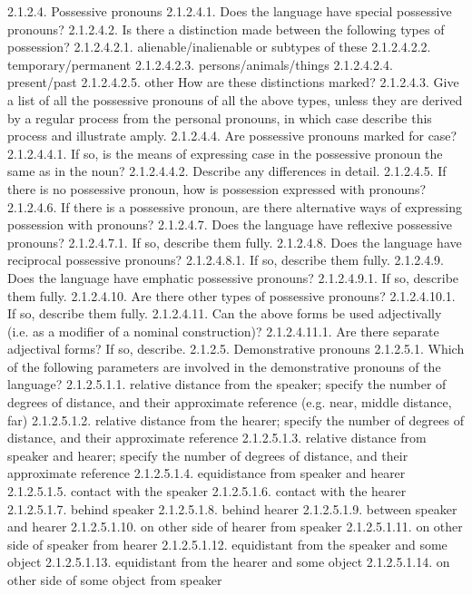 2.1.2.4. Possessive pronouns
2.1.2.4.1. Does the language have special possessive pronouns?
2.1.2.4.2. Is there a distinction made between the following types of possession?
2.1.2.4.2.1. alienable/inalienable or subtypes of these
2.1.2.4.2.2. temporary/permanent
2.1.2.4.2.3. persons/animals/things
2.1.2.4.2.4. present/past
2.1.2.4.2.5. other
How are these distinctions marked?
2.1.2.4.3. Give a list of all the possessive pronouns of all the above types, unless they are derived by a regular process from the personal pronouns, in which case describe this process and illustrate amply.
2.1.2.4.4. Are possessive pronouns marked for case?
2.1.2.4.4.1. If so, is the means of expressing case in the possessive pronoun the same as in the noun?
2.1.2.4.4.2. Describe any differences in detail.
2.1.2.4.5. If there is no possessive pronoun, how is possession expressed with pronouns?
2.1.2.4.6. If there is a possessive pronoun, are there alternative ways of expressing possession with pronouns?
2.1.2.4.7. Does the language have reflexive possessive pronouns?
2.1.2.4.7.1. If so, describe them fully.
2.1.2.4.8. Does the language have reciprocal possessive pronouns?
2.1.2.4.8.1. If so, describe them fully.
2.1.2.4.9. Does the language have emphatic possessive pronouns?
2.1.2.4.9.1. If so, describe them fully.
2.1.2.4.10. Are there other types of possessive pronouns?
2.1.2.4.10.1. If so, describe them fully.
2.1.2.4.11. Can the above forms be used adjectivally (i.e. as a modifier of a nominal construction)?
2.1.2.4.11.1. Are there separate adjectival forms? If so, describe.
2.1.2.5. Demonstrative pronouns
2.1.2.5.1. Which of the following parameters are involved in the demonstrative pronouns of the language?
2.1.2.5.1.1. relative distance from the speaker; specify the number of degrees of distance, and their approximate reference (e.g. near, middle distance, far)
2.1.2.5.1.2. relative distance from the hearer; specify the number of degrees of distance, and their approximate reference
2.1.2.5.1.3. relative distance from speaker and hearer; specify the number of degrees of distance, and their approximate reference
2.1.2.5.1.4. equidistance from speaker and hearer
2.1.2.5.1.5. contact with the speaker
2.1.2.5.1.6. contact with the hearer
2.1.2.5.1.7. behind speaker
2.1.2.5.1.8. behind hearer
2.1.2.5.1.9. between speaker and hearer
2.1.2.5.1.10. on other side of hearer from speaker
2.1.2.5.1.11. on other side of speaker from hearer
2.1.2.5.1.12. equidistant from the speaker and some object
2.1.2.5.1.13. equidistant from the hearer and some object
2.1.2.5.1.14. on other side of some object from speaker
